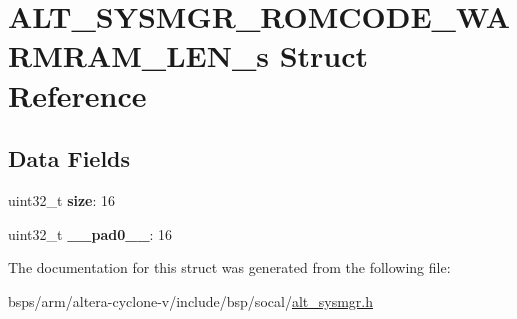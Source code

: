 \hypertarget{structALT__SYSMGR__ROMCODE__WARMRAM__LEN__s}{}\section{A\+L\+T\+\_\+\+S\+Y\+S\+M\+G\+R\+\_\+\+R\+O\+M\+C\+O\+D\+E\+\_\+\+W\+A\+R\+M\+R\+A\+M\+\_\+\+L\+E\+N\+\_\+s Struct Reference}
\label{structALT__SYSMGR__ROMCODE__WARMRAM__LEN__s}
\subsection*{Data Fields}
\begin{DoxyCompactItemize}
\item 
\mbox{\label{structALT__SYSMGR__ROMCODE__WARMRAM__LEN__s_a51e2903d45d598d761b068f067ddfa4b}} 
uint32\+\_\+t {\bfseries size}\+: 16
\item 
\mbox{\label{structALT__SYSMGR__ROMCODE__WARMRAM__LEN__s_ac3e92b9a6e6875e16cd65391a6d32c8a}} 
uint32\+\_\+t {\bfseries \+\_\+\+\_\+pad0\+\_\+\+\_\+}\+: 16
\end{DoxyCompactItemize}


The documentation for this struct was generated from the following file\+:\begin{DoxyCompactItemize}
\item 
bsps/arm/altera-\/cyclone-\/v/include/bsp/socal/\mbox{\hyperlink{alt__sysmgr_8h}{alt\+\_\+sysmgr.\+h}}\end{DoxyCompactItemize}
